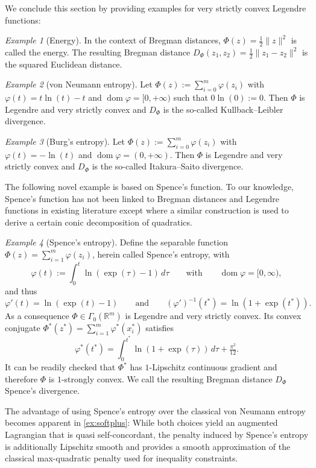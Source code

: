 \documentclass[11pt,onecolumn]{article}
\DeclareMathOperator{\dom}{dom}
\theoremstyle{remark}
\newtheorem{example}[example]{Example}
\begin{document}
We conclude this section by providing examples for very strictly convex Legendre functions:
\begin{example}[Energy] \label{ex:energy}
 In the context of Bregman distances, $\Phi(z)=\frac{1}{2}\|z\|^2$ is called the energy. The resulting Bregman distance $D_\Phi(z_1,z_2)=\frac{1}{2}\|z_1 - z_2\|^2$ is the squared Euclidean distance.
\end{example}
\begin{example}[von Neumann entropy] \label{ex:neumann}
Let $\Phi(z):=\sum_{i=0}^m \varphi(z_i)$ with $\varphi(t)=t \ln(t)-t$ and $\dom \varphi=[0,+\infty)$ such that $0 \ln(0):=0$. Then $\Phi$ is Legendre and very strictly convex and $D_\Phi$ is the so-called  Kullback--Leibler divergence.
\end{example}
\begin{example}[Burg's entropy] \label{ex:burg}
    Let $\Phi(z):=\sum_{i=0}^m \varphi(z_i)$ with $\varphi(t)=-\ln(t)$ and $\dom \varphi=(0,+\infty)$. Then $\Phi$ is Legendre and very strictly convex and $D_\Phi$ is the so-called Itakura--Saito divergence.
\end{example}
The following novel example is based on Spence's function. To our knowledge, Spence's function has not been linked to Bregman distances and Legendre functions in existing literature except \cite[Example 4.15]{laude2025anisotropic} where a similar construction is used to derive a certain conic decomposition of quadratics.
\begin{example}[Spence's entropy] \label{ex:spence}
Define the separable function $\Phi(z)=\sum_{i=1}^m \varphi(z_i)$, herein called Spence's entropy, with
\[
\varphi(t):=\int_{0}^t \ln(\exp(\tau)-1)\,d\tau\qquad \text{with}\qquad \dom\varphi=[0,\infty),
\]
and thus
\[
\varphi'(t)=\ln(\exp(t)-1)\qquad \text{and} \qquad(\varphi')^{-1}(t^*)=\ln(1+\exp(t^*)).
\]
As a consequence $\Phi\in\Gamma_0(\mathbb{R}^m)$ is Legendre and very strictly convex.
Its convex conjugate $\Phi^*(z^*)=\sum_{i=1}^m \varphi^*(x_i^*)$ satisfies
\[
\varphi^*(t^*)
=
\int_0^{t^*}\ln(1+\exp(\tau))\,d\tau+\tfrac{\pi^2}{12}.
\]
It can be readily checked that $\Phi^*$ has $1$-Lipschitz continuous gradient and therefore $\Phi$ is $1$-strongly convex. We call the resulting Bregman distance $D_\Phi$ Spence's divergence.
\end{example}
 The advantage of using Spence's entropy over the classical von Neumann entropy becomes apparent in \cref{ex:softplus}: While both choices yield an augmented Lagrangian that is quasi self-concordant, the penalty induced by Spence’s entropy is additionally Lipschitz smooth and provides a smooth approximation of the classical max-quadratic penalty used for inequality constraints.
\end{document}
